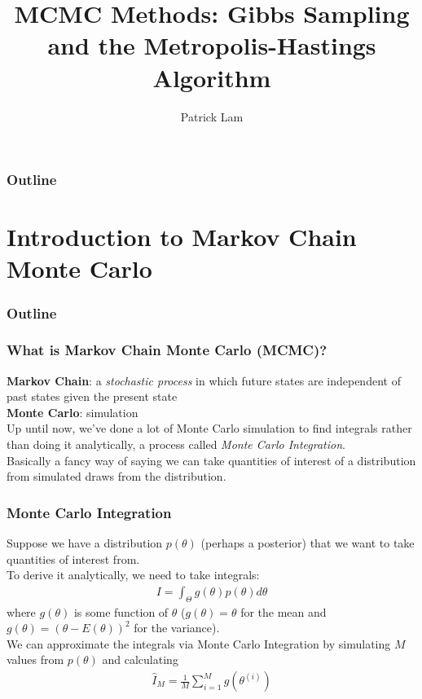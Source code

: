 \documentclass{beamer}
\author{Patrick Lam}
\title{MCMC Methods: Gibbs Sampling and the Metropolis-Hastings Algorithm}
\date{}
\begin{document}
\newcommand{\red}{\textcolor{red}}
\newcommand{\blue}{\textcolor{blue}}
\newcommand{\purple}{\textcolor{purple}}

\frame{\titlepage}

\begin{frame}
\frametitle{Outline}
\tableofcontents
\end{frame}

\section{Introduction to Markov Chain Monte Carlo}

\begin{frame}
\frametitle{Outline}
\tableofcontents[currentsection]
\end{frame}

\begin{frame}
\frametitle{What is Markov Chain Monte Carlo (MCMC)?}
\pause
\textbf{Markov Chain}: a \textit{stochastic process} in which future states are
independent of past states given the present state\\
\bigskip
\pause
\textbf{Monte Carlo}: simulation\\
\bigskip
\pause
Up until now, we've done a lot of Monte Carlo simulation to find
integrals rather than doing it analytically, a process called \textit{Monte
Carlo Integration}.\\
\bigskip
\pause 
Basically a fancy way of saying we can take
quantities of interest of a distribution from simulated draws from the
distribution.
\end{frame}

\begin{frame}
\frametitle{Monte Carlo Integration}
\pause
Suppose we have a distribution $p(\theta)$ (perhaps a posterior) that
we want to take quantities of interest from.\\
\bigskip
\pause
To derive it analytically, we need to take integrals:
\begin{eqnarray*}
I = \int_{\Theta} g(\theta) p(\theta) d\theta
\end{eqnarray*}
where $g(\theta)$ is some function of $\theta$ ($g(\theta) =
\theta$ for the mean and $g(\theta) = (\theta - E(\theta))^2$ for the
variance).\\
\bigskip
\pause
We can approximate the integrals via Monte Carlo Integration by simulating
$M$ values from $p(\theta)$ and calculating
\begin{eqnarray*}
\hat{I}_M = \frac{1}{M} \sum_{i=1}^M g(\theta^{(i)})
\end{eqnarray*}
\end{frame}
\end{document}
